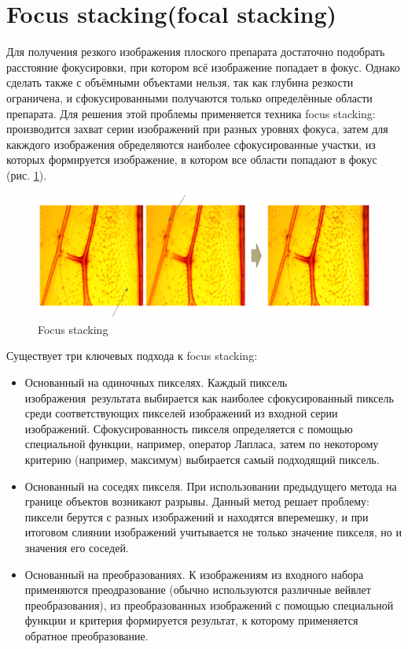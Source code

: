 \documentclass[14pt]{matmex-diploma-custom}
\begin{document}
\section{Focus stacking(focal stacking)}
Для получения резкого изображения плоского препарата достаточно подобрать расстояние фокусировки, при котором всё изображение попадает в фокус. Однако сделать также с объёмными объектами нельзя, так как глубина резкости ограничена, и сфокусированными получаются только определённые области препарата. Для решения этой проблемы применяется техника focus stacking: производится захват серии изображений при разных уровнях фокуса, затем для какждого изображения обределяются наиболее сфокусированные участки, из которых формируется изображение, в котором все области попадают в фокус (рис. \ref{focus_stacking1}).

\begin{figure}[h]
\label{focus_stacking1}
\centering
\includegraphics[width=1.0\textwidth]{figures/fs1.png}
\caption{Focus stacking}
\end{figure}

Существует три ключевых подхода к focus stacking: 
\begin{itemize}
    \item Основанный на одиночных пикселях. Каждый пиксель изображения~результата выбирается как наиболее сфокусированный пиксель среди соответствующих пикселей изображений из входной серии изображений. Сфокусированность пикселя  определяется с помощью специальной функции, например, оператор Лапласа, затем по некоторому критерию (например, максимум) выбирается самый подходящий пиксель.
    \item Основанный на соседях пикселя. При использовании предыдущего метода на границе объектов возникают разрывы. Данный метод решает проблему: пиксели берутся с разных изображений и находятся вперемешку, и при итоговом слиянии изображений учитывается не только значение пикселя, но и значения его соседей.
    \item Основанный на преобразованиях. К изображениям из входного набора применяются преодразование (обычно используются различные вейвлет преобразования), из преобразованных изображений с помощью специальной функции и критерия формируется результат, к которому применяется обратное преобразование.
\end{itemize}
\end{document}
